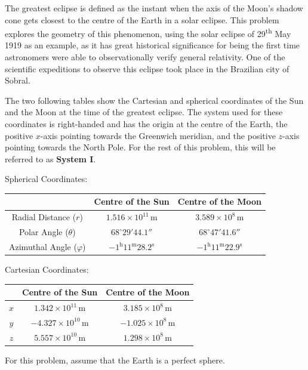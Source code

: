 The greatest eclipse is defined as the instant when the axis of the Moon's
shadow cone gets closest to the centre of the Earth in a solar eclipse. This
problem explores the geometry of this phenomenon, using the solar eclipse of
29\textsuperscript{th} May 1919 as an example, as it has great historical
significance for being the first time astronomers were able to
observationally verify general relativity. One of the scientific expeditions
to observe this eclipse took place in the Brazilian city of Sobral.

The two following tables show the Cartesian and spherical coordinates of the
Sun and the Moon at the time of the greatest eclipse. The system used for
these coordinates is right-handed and has the origin at the centre of the
Earth, the positive $x$-axis pointing towards the Greenwich meridian, and the
positive $z$-axis pointing towards the North Pole. For the rest of this
problem, this will be referred to as \textbf{System I}.

Spherical Coordinates:
\begin{center}
\begin{tabular}{c|c|c}
 & Centre of the Sun & Centre of the Moon \\
\hline
Radial Distance ($r$) & $1.516 \times 10^{11}$\,m
  & $3.589 \times 10^{8}$\,m \\
Polar Angle ($\theta$) & $68^\circ 29' 44.1''$ & $68^\circ 47' 41.6''$ \\
Azimuthal Angle ($\varphi$) & $-1^{\mathrm{h}}11^{\mathrm{m}}28.2^{\mathrm{s}}$
  & $-1^{\mathrm{h}}11^{\mathrm{m}}22.9^{\mathrm{s}}$ \\
\end{tabular}
\end{center}

Cartesian Coordinates:
\begin{center}
\begin{tabular}{c|c|c}
 & Centre of the Sun & Centre of the Moon \\
\hline
$x$ & $1.342 \times 10^{11}$\,m & $3.185 \times 10^{8}$\,m \\
$y$ & $-4.327 \times 10^{10}$\,m & $-1.025 \times 10^{8}$\,m \\
$z$ & $5.557 \times 10^{10}$\,m & $1.298 \times 10^{8}$\,m \\
\end{tabular}
\end{center}

For this problem, assume that the Earth is a perfect sphere.

